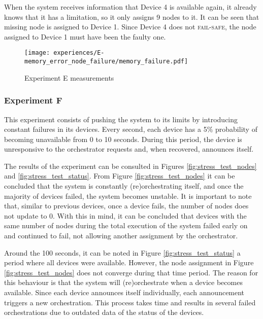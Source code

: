 When the system receives information that Device 4 is available again, it already knows that it has a limitation, so it only assigns 9 nodes to it. It can be seen that missing node is assigned to Device 1. Since Device 4 does not \textsc{fail-safe}, the node assigned to Device 1 must have been the faulty one.

\begin{figure}[h]
\centering
\texttt{[image: experiences/E-memory\_error\_node\_failure/memory\_failure.pdf]}
\caption[Experiment E measurements]{Experiment E measurements}\label{fig:experiment_e_graph}
\end{figure}


\subsubsection{Experiment F}\label{sec:experiment_f}

This experiment consists of pushing the system to its limits by introducing constant failures in its devices. Every second, each device has a 5\% probability of becoming unavailable from 0 to 10 seconds. During this period, the device is unresponsive to the orchestrator requests and, when recovered, announces itself.

The results of the experiment can be consulted in Figures \ref{fig:stress_test_nodes} and \ref{fig:stress_test_status}. From Figure \ref{fig:stress_test_nodes} it can be concluded that the system is constantly (re)orchestrating itself, and once the majority of devices failed, the system becomes unstable. It is important to note that, similar to previous devices, once a device fails, the number of nodes does not update to 0. With this in mind, it can be concluded that devices with the same number of nodes during the total execution of the system failed early on and continued to fail, not allowing another assignment by the orchestrator.

Around the 100 seconds, it can be noted in Figure \ref{fig:stress_test_status} a period where all devices were available. However, the node assignment in Figure \ref{fig:stress_test_nodes} does not converge during that time period. The reason for this behaviour is that the system will (re)orchestrate when a device becomes available. Since each device announces itself individually, each announcement triggers a new orchestration. This process takes time and results in several failed orchestrations due to outdated data of the status of the devices. 

